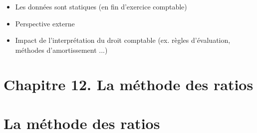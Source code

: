 \documentclass{article}
\begin{document}
\begin{itemize}
    \item Les données sont statiques (en fin d'exercice comptable) 
    \item Perspective externe
    \item Impact de l'interprétation du droit comptable (ex. règles d'évaluation, méthodes d'amortissement ...)
\end{itemize}

\section*{Chapitre 12. La méthode des ratios}
\section{La méthode des ratios}
\end{document}
